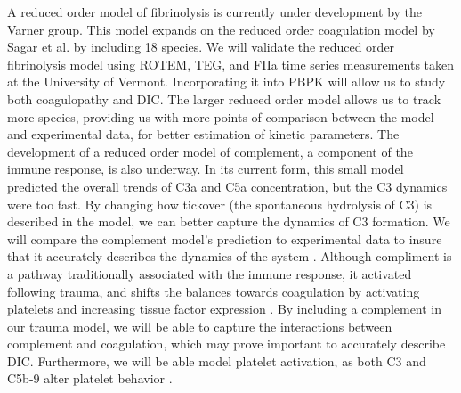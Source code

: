 \documentclass[11pt]{article}
\begin{document}
A reduced order model of fibrinolysis is currently under development by the Varner group. This model expands on the reduced order coagulation model by Sagar et al. by including 18 species. We will validate the reduced order fibrinolysis model using ROTEM, TEG, and FIIa time series measurements taken at the University of Vermont. Incorporating it into PBPK will allow us to study both coagulopathy and DIC. The larger reduced order model allows us to track more species, providing us with more points of comparison between the model and experimental data, for better estimation of kinetic parameters. The development of a reduced order model of complement, a component of the immune response, is also underway. In its current form, this small model predicted the overall trends of C3a and C5a concentration, but the C3 dynamics were too fast. By changing how tickover (the spontaneous hydrolysis of C3) is described in the model, we can better capture the dynamics of C3 formation.  We will compare the complement model's prediction to experimental data to insure that it accurately describes the dynamics of the system \cite{morad2015time}. Although compliment is a pathway traditionally associated with the immune response, it activated following trauma, and shifts the balances towards coagulation by activating platelets and increasing tissue factor expression \cite{markiewski2007complement}. By including a complement in our trauma model, we will be able to capture the interactions between complement and coagulation, which may prove important to accurately describe DIC. Furthermore, we will be able model platelet activation, as both C3 and C5b-9 alter platelet behavior \cite{peerschke2008platelet}.
\end{document}
